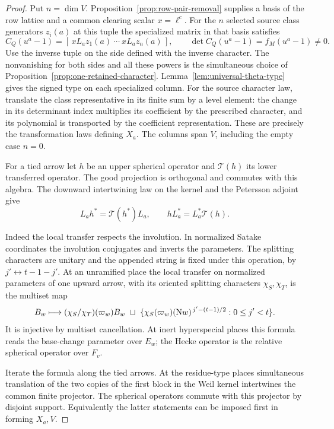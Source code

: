 \begin{proof}
Put \(n=\dim V\). Proposition~\ref{prop:row-pair-removal} supplies a basis
of the row lattice and a common clearing scalar \(x=\ell^c\).
For the \(n\) selected source class generators \(z_i(a)\) at this
tuple the specialized matrix in that basis satisfies
\[
       C_Q(u^a-1)=
         [\,xL_a z_1(a)\ \cdots\ xL_a z_n(a)\,],\qquad
       \det C_Q(u^a-1)=f_M(u^a-1)\ne0 .
\]
Use the inverse tuple on the side defined with the inverse character.
The nonvanishing for both sides and all these powers is the simultaneous
choice of Proposition~\ref{prop:one-retained-character}.
Lemma~\ref{lem:universal-theta-type} gives the signed type on each
specialized column. For the source character law, translate the
class representative in its finite sum by a level element: the
change in its determinant index multiplies its coefficient by the
prescribed character, and its polynomial is transported by the
coefficient representation. These are precisely the transformation
laws defining \(X_a\). The columns span \(V\), including the empty
case \(n=0\).

For a tied arrow let \(h\) be an upper spherical operator and
\(\mathcal T(h)\) its lower transferred operator. The good projection
is orthogonal and commutes with this algebra. The downward
intertwining law on the kernel and the Petersson adjoint give
\[
 L_a h^*=\mathcal T(h^*)L_a,\qquad
 h L_a^*=L_a^*\mathcal T(h).
\]

Indeed the local transfer respects the involution. In normalized
Satake coordinates the involution conjugates and inverts the
parameters. The splitting characters are unitary and the appended
string is fixed under this operation, by \(j'\leftrightarrow t-1-j'\).
At an unramified place the local transfer on normalized parameters of
one upward arrow, with its oriented splitting characters
\(\chi_S,\chi_T\), is the multiset map
\[
 B_w\longmapsto
     (\chi_S/\chi_T)(\varpi_w)B_w
       \ \sqcup\
     \{\chi_S(\varpi_w)({\rm N}w)^{\,j'-(t-1)/2}:0\le j'<t\}.
\]
It is injective by multiset cancellation. At inert hyperspecial
places this formula reads the base-change parameter over \(E_w\);
the Hecke operator is the relative spherical operator over \(F_v\).

Iterate the formula along the tied arrows. At the residue-type
places simultaneous translation of the two copies of the first
block in the Weil kernel intertwines the common finite projector.
The spherical operators commute with this projector by disjoint
support. Equivalently the latter statements can be imposed first
in forming \(X_a,V\).


\end{proof}
